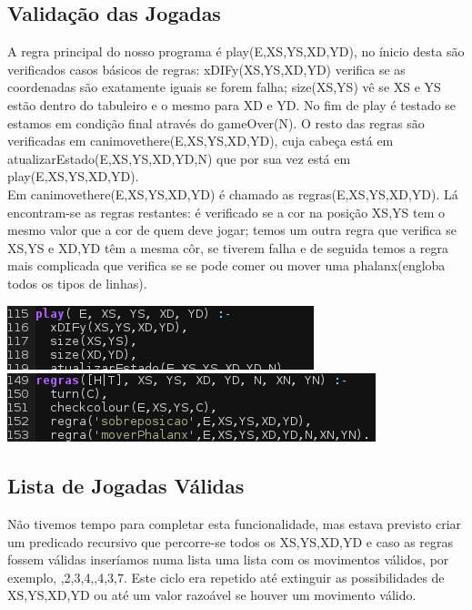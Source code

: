 \documentclass[a4paper]{article}
\begin{document}
\subsection{Validação das Jogadas}
A regra principal do nosso programa é play(E,XS,YS,XD,YD), no ínicio desta são verificados casos básicos de regras: xDIFy(XS,YS,XD,YD) verifica se as coordenadas são exatamente iguais se forem falha; size(XS,YS) vê se XS e YS estão dentro do tabuleiro e o mesmo para XD e YD. No fim de play é testado se estamos em condição final através do gameOver(N). O resto das regras são verificadas em canimovethere(E,XS,YS,XD,YD), cuja cabeça está em atualizarEstado(E,XS,YS,XD,YD,N) que por sua vez está em play(E,XS,YS,XD,YD).
\\\linebreak
Em canimovethere(E,XS,YS,XD,YD) é chamado as regras(E,XS,YS,XD,YD). Lá encontram-se as regras restantes: é verificado se a cor na posição XS,YS tem o mesmo valor que a cor de quem deve jogar; temos um outra regra que verifica se XS,YS e XD,YD têm a mesma côr, se tiverem falha e de seguida temos a regra mais complicada que verifica se se pode comer ou mover uma phalanx(engloba todos os tipos de linhas).
\begin{center}
\includegraphics[scale=0.70]{regras1.png}
\includegraphics[scale=0.70]{regras.png}
\end{center}

\subsection{Lista de Jogadas Válidas}
Não tivemos tempo para completar esta funcionalidade, mas estava previsto criar um predicado recursivo que percorre-se todos os XS,YS,XD,YD e caso as regras fossem válidas inseríamos numa lista uma lista com os movimentos válidos, por exemplo, \lbrack{},2,3,4\rbrack,,4,3,7\rbrack\rbrack. Este ciclo era repetido até extinguir as possibilidades de XS,YS,XD,YD ou até um valor razoável se houver um movimento válido.
\end{document}
